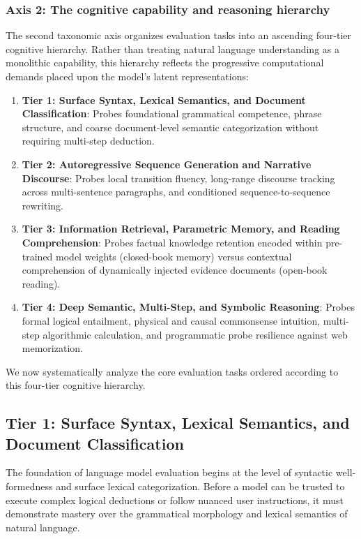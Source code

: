 \documentclass[../../main.tex]{subfiles}
\begin{document}
\subsubsection{Axis 2: The cognitive capability and reasoning hierarchy}
The second taxonomic axis organizes evaluation tasks into an ascending four-tier cognitive hierarchy. Rather than treating natural language understanding as a monolithic capability, this hierarchy reflects the progressive computational demands placed upon the model's latent representations:
\begin{enumerate}
    \item \textbf{Tier 1: Surface Syntax, Lexical Semantics, and Document Classification}: Probes foundational grammatical competence, phrase structure, and coarse document-level semantic categorization without requiring multi-step deduction.
    \item \textbf{Tier 2: Autoregressive Sequence Generation and Narrative Discourse}: Probes local transition fluency, long-range discourse tracking across multi-sentence paragraphs, and conditioned sequence-to-sequence rewriting.
    \item \textbf{Tier 3: Information Retrieval, Parametric Memory, and Reading Comprehension}: Probes factual knowledge retention encoded within pre-trained model weights (closed-book memory) versus contextual comprehension of dynamically injected evidence documents (open-book reading).
    \item \textbf{Tier 4: Deep Semantic, Multi-Step, and Symbolic Reasoning}: Probes formal logical entailment, physical and causal commonsense intuition, multi-step algorithmic calculation, and programmatic probe resilience against web memorization.
\end{enumerate}

We now systematically analyze the core evaluation tasks ordered according to this four-tier cognitive hierarchy.

\subsection{Tier 1: Surface Syntax, Lexical Semantics, and Document Classification}
\label{subsec:tier1_syntax_classification}

The foundation of language model evaluation begins at the level of syntactic well-formedness and surface lexical categorization. Before a model can be trusted to execute complex logical deductions or follow nuanced user instructions, it must demonstrate mastery over the grammatical morphology and lexical semantics of natural language.
\end{document}
